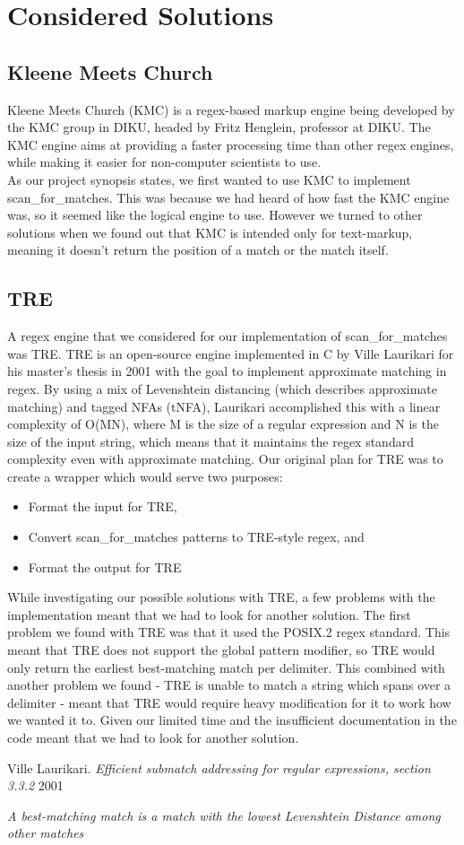 \documentclass[11pt,twoside,a4paper]{article}
\begin{document}
\section{Considered Solutions}
\subsection{Kleene Meets Church}
Kleene Meets Church (KMC) is a regex-based markup engine being developed by 
the KMC group in DIKU, headed by Fritz Henglein, professor at DIKU. The KMC 
engine aims at providing a faster processing time than other regex engines, 
while making it easier for non-computer scientists to use.\\
As our project synopsis states, we first wanted to use KMC to implement 
scan\_for\_matches. This was because we had heard of 
how fast the KMC engine was, so it seemed like the logical engine to use. 
However we turned to other solutions when we found out that 
KMC is intended only for text-markup, meaning it doesn't return the position 
of a match or the match itself. 

\subsection{TRE}
A regex engine that we considered for our implementation of scan\_for\_matches 
was TRE. TRE is an open-source engine implemented in C by Ville Laurikari for 
his master's thesis in 2001 with the goal to implement approximate matching in 
regex. By using a mix of Levenshtein distancing (which describes 
approximate matching) and tagged NFAs (tNFA), Laurikari accomplished this with a 
linear complexity of O(MN), where M is the size of a regular expression and N is the 
size of the input string\cite{LaurikariComplex}, which means that it maintains the 
regex standard complexity even with approximate matching. Our original plan 
for TRE was to create a wrapper which would serve two purposes:
\begin{itemize}
\item Format the input for TRE, 
\item Convert scan\_for\_matches patterns to TRE-style regex, and
\item Format the output for TRE
\end{itemize}
While investigating our possible solutions with TRE, a few problems 
with the implementation meant that we 
had to look for another solution. The first problem we found with TRE was that 
it used the POSIX.2 regex standard. This meant that TRE does not support the 
global pattern modifier, so TRE would only return the earliest best-matching 
match per delimiter\cite{Best-Match}. This combined with another problem we found 
- TRE is unable to match a string which spans over a delimiter - meant that 
TRE would require heavy modification for it to work how we wanted it to. Given our 
limited time and the insufficient documentation in the code meant that 
we had to look for another solution.

\begin{thebibliography}{9}
Ville Laurikari.
\textit{Efficient submatch addressing for regular expressions, section 3.3.2}
2001

\textit{A best-matching match is a match with the lowest Levenshtein Distance among other matches}

\end{thebibliography}
\end{document}
